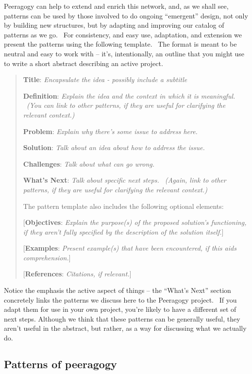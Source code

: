 Peeragogy can help to extend and enrich this network, and, as we shall
see, patterns can be used by those involved to do ongoing ``emergent''
design, not only by building new structures, but by adapting and
improving our catalog of patterns as we go.~ For consistency, and easy
use, adaptation, and extension we present the patterns using the
following template.~ The format is meant to be neutral and easy to work
with -- it's, intentionally, an outline that you might use to write a
short abstract describing an active project.

\begin{quote}
\textbf{Title}: \emph{Encapsulate the idea - possibly include a
subtitle}

\textbf{Definition}: \emph{Explain the idea and the context in which it
is meaningful. ~(You can link to other patterns, if they are useful for
clarifying the relevant context.)}

\textbf{Problem}: \emph{Explain why there's some issue to address here.}

\textbf{Solution}: \emph{Talk about an idea about how to address the
issue.}

\textbf{Challenges}: \emph{Talk about what can go wrong.}

\textbf{What's Next}: \emph{Talk about specific next steps. ~(Again,
link to other patterns, if they are useful for clarifying the relevant
context.)}

The pattern template also includes the following optional elements:

{[}\textbf{Objectives}: \emph{Explain the purpose(s) of the proposed
solution's functioning, if they aren't fully specified by the
description of the solution itself.}{]}

{[}\textbf{Examples}: \emph{Present example(s) that have been
encountered, if this aids comprehension.}{]}

{[}\textbf{References}: \emph{Citations, if relevant.}{]}
\end{quote}

Notice the emphasis the active aspect of things -- the ``What's Next''
section concretely links the patterns we discuss here to the Peeragogy
project.~ If you adapt them for use in your own project, you're likely
to have a different set of next steps. Although we think that these
patterns can be generally useful, they aren't useful in the abstract,
but rather, as a way for discussing what we actually do.

\subsection{Patterns of peeragogy}


